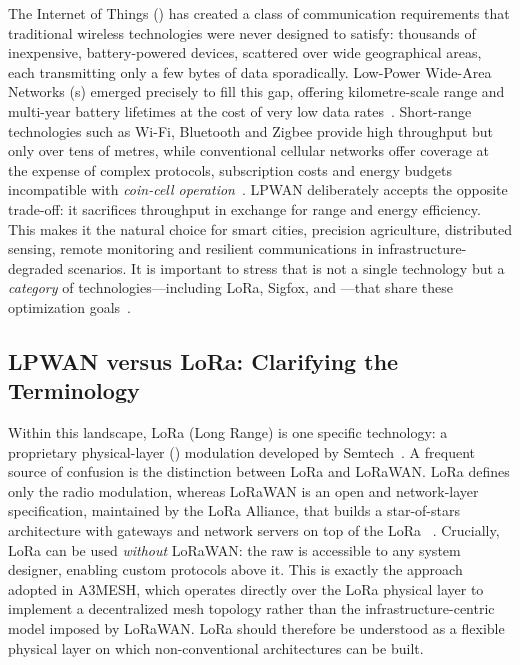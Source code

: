 \documentclass[english,bachelor]{tfgitic}[2026/01/22]
\begin{document}
The Internet of Things () has created a class of communication requirements that traditional wireless technologies were never designed
to satisfy: thousands of inexpensive, battery-powered devices, scattered over wide geographical areas, each transmitting only a few
bytes of data sporadically. Low-Power Wide-Area Networks (s) emerged precisely to fill this gap, offering kilometre-scale range 
and multi-year battery lifetimes at the cost of very low data rates~\cite{raza2017lpwan}. Short-range technologies such as Wi-Fi, 
Bluetooth and Zigbee provide high throughput but only over tens of metres, while conventional cellular networks offer coverage at the 
expense of complex protocols, subscription costs and energy budgets incompatible with \emph{coin-cell operation}~\cite{mekki2019comparative}. 
LPWAN deliberately accepts the opposite trade-off: it sacrifices throughput in exchange for range and energy efficiency. This makes it 
the natural choice for smart cities, precision agriculture, distributed sensing, remote monitoring and resilient communications in 
infrastructure-degraded scenarios. It is important to stress that  is not a single technology but a \emph{category} of technologies---including LoRa, Sigfox, and ---that share these optimization goals~\cite{raza2017lpwan}.

\subsection{LPWAN versus LoRa: Clarifying the Terminology}

Within this landscape, LoRa (Long Range) is one specific  technology: a proprietary physical-layer () modulation developed by
Semtech~\cite{semtech2015an1200}. A frequent source of confusion is the distinction between LoRa and LoRaWAN. LoRa defines only the radio modulation,
whereas LoRaWAN is an open  and network-layer specification, maintained by the LoRa Alliance, that builds a star-of-stars architecture with gateways and
network servers on top of the LoRa ~\cite{lorawan2017spec}. Crucially, LoRa can be used \emph{without} LoRaWAN: the raw  is accessible to any system designer,
enabling custom protocols above it. This is exactly the approach adopted in A3MESH, which operates directly over the LoRa physical layer to implement a decentralized
mesh topology rather than the infrastructure-centric model imposed by LoRaWAN. LoRa should therefore be understood as a flexible physical layer on which
non-conventional architectures can be built.
\end{document}
